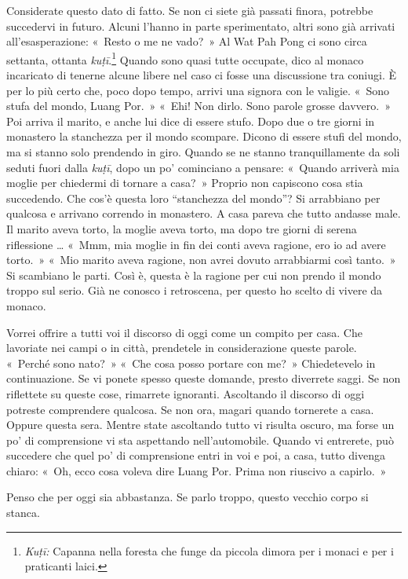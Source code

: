 \enlargethispage{-\baselineskip}

Considerate questo dato di fatto. Se non ci siete già passati finora,
potrebbe succedervi in futuro. Alcuni l'hanno in parte sperimentato,
altri sono già arrivati all'esasperazione: «~Resto o me ne vado?~» Al
Wat Pah Pong ci sono circa settanta, ottanta \emph{kuṭī}.\footnote{\emph{Kuṭī:}
  Capanna nella foresta che funge da piccola dimora per i monaci e per i
  praticanti laici.} Quando sono quasi tutte occupate, dico al monaco
incaricato di tenerne alcune libere nel caso ci fosse una discussione
tra coniugi. È per lo più certo che, poco dopo tempo, arrivi una signora
con le valigie. «~Sono stufa del mondo, Luang Por.~» «~Ehi! Non dirlo.
Sono parole grosse davvero.~» Poi arriva il marito, e anche lui dice di
essere stufo. Dopo due o tre giorni in monastero la stanchezza per il
mondo scompare. Dicono di essere stufi del mondo, ma si stanno solo
prendendo in giro. Quando se ne stanno tranquillamente da soli seduti
fuori dalla \emph{kuṭī}, dopo un po' cominciano a pensare: «~Quando
arriverà mia moglie per chiedermi di tornare a casa?~» Proprio non
capiscono cosa stia succedendo. Che cos'è questa loro ``stanchezza del
mondo''? Si arrabbiano per qualcosa e arrivano correndo in monastero. A
casa pareva che tutto andasse male. Il marito aveva torto, la moglie
aveva torto, ma dopo tre giorni di serena riflessione \ldots{} «~Mmm, mia
moglie in fin dei conti aveva ragione, ero io ad avere torto.~» «~Mio
marito aveva ragione, non avrei dovuto arrabbiarmi così tanto.~» Si
scambiano le parti. Così è, questa è la ragione per cui non prendo il
mondo troppo sul serio. Già ne conosco i retroscena, per questo ho
scelto di vivere da monaco.

Vorrei offrire a tutti voi il discorso di oggi come un compito per casa.
Che lavoriate nei campi o in città, prendetele in considerazione queste
parole. «~Perché sono nato?~» «~Che cosa posso portare con me?~»
Chiedetevelo in continuazione. Se vi ponete spesso queste domande,
presto diverrete saggi. Se non riflettete su queste cose, rimarrete
ignoranti. Ascoltando il discorso di oggi potreste comprendere qualcosa.
Se non ora, magari quando tornerete a casa. Oppure questa sera. Mentre
state ascoltando tutto vi risulta oscuro, ma forse un po' di
comprensione vi sta aspettando nell'automobile. Quando vi entrerete, può
succedere che quel po' di comprensione entri in voi e poi, a casa, tutto
divenga chiaro: «~Oh, ecco cosa voleva dire Luang Por. Prima non
riuscivo a capirlo.~»

Penso che per oggi sia abbastanza. Se parlo troppo, questo vecchio corpo
si stanca.

